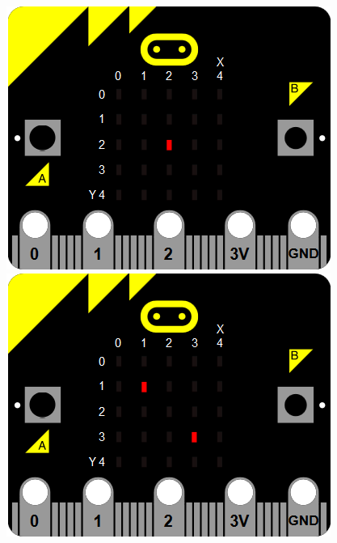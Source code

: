 \documentclass[11pt]{article}
\begin{document}
\begin{figure}[!h]
\begin{center}
\includegraphics[scale=0.3]{die1.png}\includegraphics[scale=0.3]{die2.png}\\

\end{center}
\end{figure}
\end{document}
